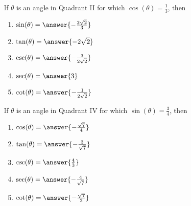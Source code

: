 \documentclass{ximera}
\author{Kenneth Berglund}
\begin{document}
\begin{exercise}

  If $\theta$ is an angle in Quadrant II for which $\cos(\theta)=\frac{1}{3}$, then 

	\begin{enumerate}
		\item $\sin(\theta) = \answer{-\frac{2\sqrt{2}}{3}}$
		\item $\tan(\theta) = \answer{-2\sqrt{2}}$
		\item $\csc(\theta) = \answer{-\frac{3}{2\sqrt{2}}}$
		\item $\sec(\theta) = \answer{3}$
		\item $\cot(\theta) = \answer{-\frac{1}{2\sqrt{2}}}$
	\end{enumerate}

\end{exercise}

\begin{exercise}

  If $\theta$ is an angle in Quadrant IV for which $\sin(\theta)=\frac{3}{4}$, then 

	\begin{enumerate}
		\item $\cos(\theta) = \answer{-\frac{\sqrt{7}}{4}}$
		\item $\tan(\theta) = \answer{-\frac{3}{\sqrt{7}}}$
		\item $\csc(\theta) = \answer{\frac{4}{3}}$
		\item $\sec(\theta) = \answer{-\frac{4}{\sqrt{7}}}$
		\item $\cot(\theta) = \answer{-\frac{\sqrt{7}}{3}}$
	\end{enumerate}

\end{exercise}
\end{document}
